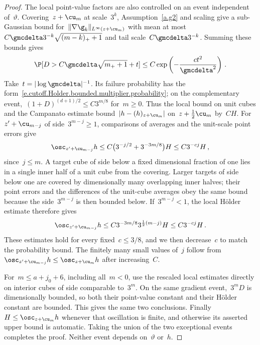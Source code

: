 \documentclass[11pt]{amsart}
\begin{document}
\begin{proof}
The local point-value factors are also controlled on an event independent of~$\vartheta$. Covering~$z+\cu_m$ at scale~$3^k$, Assumption~\ref{a.g2} and scaling give a sub-Gaussian bound for~$\|\nabla\g_k\|_{L^\infty(z+\cu_m)}$ with mean at most~$C\gmcdelta3^{-k}\sqrt{(m-k)_++1}$ and tail scale~$C\gmcdelta3^{-k}$. Summing these bounds gives
\begin{equation*}
	\P[D>C\gmcdelta\sqrt{m_++1}+t]
	\leq C\exp\left(-\frac{ct^2}{\gmcdelta^2}\right)\,.
\end{equation*}
Take~$t=|\log\gmcdelta|^{-1}$. Its failure probability has the form~\eqref{e.cutoff.Holder.bounded.multiplier.probability}; on the complementary event,~$(1+D)^{(d+1)/2}\leq C3^{m/8}$ for~$m\geq0$. Thus the local bound on unit cubes and the Campanato estimate bound~$|h-(h)_{z+\cu_m}|$ on~$z+\tfrac12\cu_m$ by~$CH$. For~$z'+\cu_{m-j}$ of side~$3^{m-j}\geq1$, comparisons of averages and the unit-scale point errors give
\begin{equation*}
	\osc_{z'+\cu_{m-j}}h\leq C\bigl(3^{-j/2}+3^{-3m/8}\bigr)H
	\leq C3^{-cj}H\,,
\end{equation*}
since~$j\leq m$. A target cube of side below a fixed dimensional fraction of one lies in a single inner half of a unit cube from the covering. Larger targets of side below one are covered by dimensionally many overlapping inner halves; their point errors and the differences of the unit-cube averages obey the same bound because the side~$3^{m-j}$ is then bounded below. If~$3^{m-j}<1$, the local H\"older estimate therefore gives
\begin{equation*}
	\osc_{z'+\cu_{m-j}}h\leq C3^{-3m/8}3^{\frac12(m-j)}H
	\leq C3^{-cj}H\,.
\end{equation*}
These estimates hold for every fixed~$c\leq3/8$, and we then decrease~$c$ to match the probability bound. The finitely many small values of~$j$ follow from~$\osc_{z'+\cu_{m-j}}h\leq\osc_{z+\cu_m}h$ after increasing~$C$.

\smallskip

For~$m\leq a+j_0+6$, including all~$m<0$, use the rescaled local estimates directly on interior cubes of side comparable to~$3^m$. On the same gradient event,~$3^mD$ is dimensionally bounded, so both their point-value constant and their H\"older constant are bounded. This gives the same two conclusions. Finally~$H\leq\osc_{z+\cu_m}h$ whenever that oscillation is finite, and otherwise its asserted upper bound is automatic. Taking the union of the two exceptional events completes the proof. Neither event depends on~$\vartheta$ or~$h$.
\end{proof}
\end{document}

